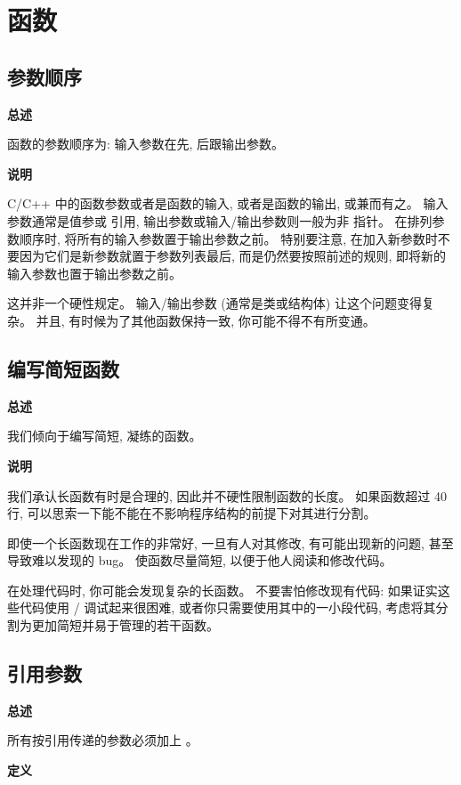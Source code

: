 \chapter{函数}

\section{参数顺序}

\textbf{总述}

函数的参数顺序为: 输入参数在先, 后跟输出参数。

\textbf{说明}

C/C++ 中的函数参数或者是函数的输入, 或者是函数的输出, 或兼而有之。 输入参数通常是值参或  引用, 输出参数或输入/输出参数则一般为非  指针。 在排列参数顺序时, 将所有的输入参数置于输出参数之前。 特别要注意, 在加入新参数时不要因为它们是新参数就置于参数列表最后, 而是仍然要按照前述的规则, 即将新的输入参数也置于输出参数之前。

这并非一个硬性规定。 输入/输出参数 (通常是类或结构体) 让这个问题变得复杂。 并且, 有时候为了其他函数保持一致, 你可能不得不有所变通。

\section{编写简短函数}

\textbf{总述}

我们倾向于编写简短, 凝练的函数。

\textbf{说明}

我们承认长函数有时是合理的, 因此并不硬性限制函数的长度。 如果函数超过 40 行, 可以思索一下能不能在不影响程序结构的前提下对其进行分割。

即使一个长函数现在工作的非常好, 一旦有人对其修改, 有可能出现新的问题, 甚至导致难以发现的 bug。 使函数尽量简短, 以便于他人阅读和修改代码。

在处理代码时, 你可能会发现复杂的长函数。 不要害怕修改现有代码: 如果证实这些代码使用 / 调试起来很困难, 或者你只需要使用其中的一小段代码, 考虑将其分割为更加简短并易于管理的若干函数。

\section{引用参数}

\textbf{总述}

所有按引用传递的参数必须加上 。

\textbf{定义}

